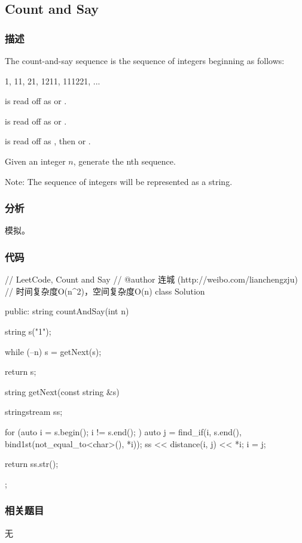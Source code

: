 \subsection{Count and Say} %
\label{sec:count-and-say}


\subsubsection{描述}
The count-and-say sequence is the sequence of integers beginning as follows:
\begin{Code}
	1, 11, 21, 1211, 111221, ...
\end{Code}

 is read off as  or .

 is read off as  or .

 is read off as , then  or .

Given an integer $n$, generate the nth sequence.

Note: The sequence of integers will be represented as a string.


\subsubsection{分析}
模拟。


\subsubsection{代码}
\begin{Code}
	// LeetCode, Count and Say
	// @author 连城 (http://weibo.com/lianchengzju)
	// 时间复杂度O(n^2)，空间复杂度O(n)
	class Solution {
		public:
		string countAndSay(int n) {
			string s("1");
			
			while (--n)
			s = getNext(s);
			
			return s;
		}
		
		string getNext(const string &s) {
			stringstream ss;
			
			for (auto i = s.begin(); i != s.end(); ) {
				auto j = find_if(i, s.end(), bind1st(not_equal_to<char>(), *i));
				ss << distance(i, j) << *i;
				i = j;
			}
			
			return ss.str();
		}
	};
\end{Code}


\subsubsection{相关题目}
\begindot
\item 无
\myenddot


